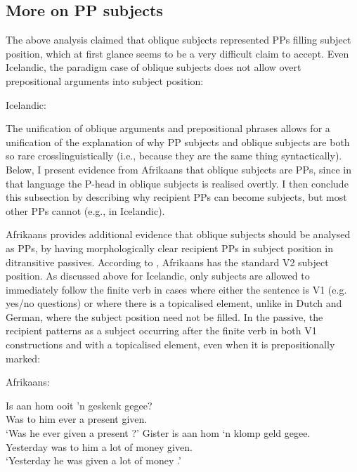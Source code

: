 \subsection{More on PP subjects}
The above analysis claimed that oblique subjects represented PPs filling subject position, which at first glance seems to be a very difficult claim to accept. Even Icelandic, the paradigm case of oblique subjects does not allow overt prepositional arguments into subject position: 

\begin{exe}
	\ex Icelandic:\label{ex:ice-ppsbj}
	\begin{xlist}
	\end{xlist}
\end{exe}

The unification of oblique arguments and prepositional phrases allows for a unification of the explanation of why PP subjects and oblique subjects are both so rare crosslinguistically (i.e., because they are the same thing syntactically). Below, I present evidence from Afrikaans that oblique subjects are PPs, since in that language the P-head in oblique subjects is realised overtly. I then conclude this subsection by describing why recipient PPs can become subjects, but most other PPs cannot (e.g., in Icelandic).

Afrikaans provides additional evidence that oblique subjects should be analysed as PPs, by having morphologically clear recipient PPs in subject position in ditransitive passives. According to \cite{Stadler.1996}, Afrikaans has the standard V2 subject position. As discussed above for Icelandic, only subjects are allowed to immediately follow the finite verb in cases where either the sentence is V1 (e.g. yes/no questions) or where there is a topicalised element, unlike in Dutch and German, where the subject position need not be filled. In the passive, the recipient patterns as a subject occurring after the finite verb in both V1 constructions and with a topicalised element, even when it is prepositionally marked:
\begin{exe}
	\ex Afrikaans: \label{ex:af-rec-pass1}
\begin{xlist}
\ex \gll Is aan hom ooit 'n geskenk gegee?\\
Was to him ever a present given.\\
\trans `Was he ever given a present \citep[ex. 49]{Stadler.1996}?'
\ex \gll Gister is aan hom `n klomp geld gegee.\\
Yesterday was to him a {lot of} money given.\\
\trans `Yesterday he was given a lot of money \citep[ex. 50]{Stadler.1996}.'
\end{xlist}
\end{exe}

